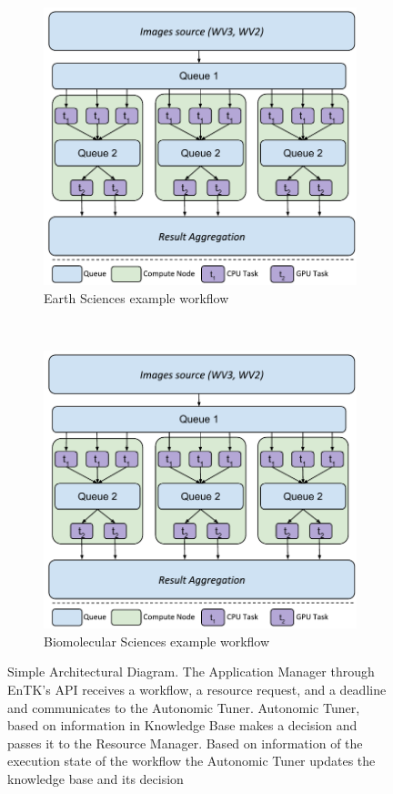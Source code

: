 \begin{figure}[ht!]
    \centering
    \begin{subfigure}[b]{0.25\textwidth}
        \includegraphics[width=\linewidth]{figures/SealsDesign2.pdf}
        \caption{Earth Sciences example workflow}
    \end{subfigure}%
    ~ 
    \begin{subfigure}[b]{0.25\textwidth}
        \includegraphics[width=\linewidth]{figures/SealsDesign2.pdf}
        \caption{Biomolecular Sciences example workflow}
    \end{subfigure}
    \caption{Simple Architectural Diagram. The Application Manager through 
    EnTK's API receives a workflow, a resource request, and a deadline and 
    communicates to the Autonomic Tuner. Autonomic Tuner, based on information 
    in Knowledge Base makes a decision and passes it to the Resource Manager. 
    Based on information of the execution state of the workflow the Autonomic 
    Tuner updates the knowledge base and its decision}\label{fig:bio_earth_workflows}
\end{figure}

